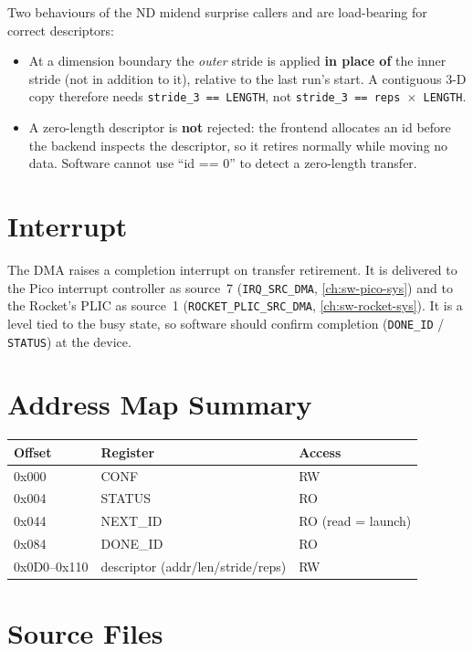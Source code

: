 \begin{docwarning}
Two behaviours of the ND midend surprise callers and are load-bearing for correct descriptors:
\begin{itemize}[nosep]
  \item At a dimension boundary the \emph{outer} stride is applied \textbf{in place of} the inner
        stride (not in addition to it), relative to the last run's start. A contiguous 3-D copy
        therefore needs \texttt{stride\_3 == LENGTH}, not \texttt{stride\_3 == reps $\times$ LENGTH}.
  \item A zero-length descriptor is \textbf{not} rejected: the frontend allocates an id before the
        backend inspects the descriptor, so it retires normally while moving no data. Software cannot
        use ``id == 0'' to detect a zero-length transfer.
\end{itemize}
\end{docwarning}

\section{Interrupt}
The DMA raises a completion interrupt on transfer retirement. It is delivered to the Pico interrupt
controller as source~7 (\texttt{IRQ\_SRC\_DMA}, \autoref{ch:sw-pico-sys}) and to the Rocket's PLIC as
source~1 (\texttt{ROCKET\_PLIC\_SRC\_DMA}, \autoref{ch:sw-rocket-sys}). It is a level tied to the busy
state, so software should confirm completion (\texttt{DONE\_ID} / \texttt{STATUS}) at the device.

\section{Address Map Summary}

\begin{tabular}{@{}lll@{}}
\toprule
\textbf{Offset} & \textbf{Register} & \textbf{Access} \\
\midrule
0x000 & CONF     & RW \\
0x004 & STATUS   & RO \\
0x044 & NEXT\_ID & RO (read = launch) \\
0x084 & DONE\_ID & RO \\
0x0D0--0x110 & descriptor (addr/len/stride/reps) & RW \\
\bottomrule
\end{tabular}

\section{Source Files}

